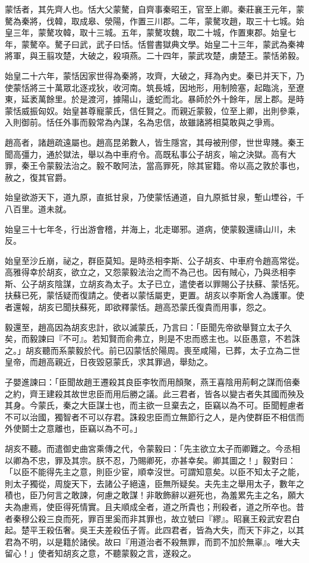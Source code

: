 
\begin{pinyinscope}
蒙恬者，其先齊人也。恬大父蒙驁，自齊事秦昭王，官至上卿。秦莊襄王元年，蒙驁為秦將，伐韓，取成皋、滎陽，作置三川郡。二年，蒙驁攻趙，取三十七城。始皇三年，蒙驁攻韓，取十三城。五年，蒙驁攻魏，取二十城，作置東郡。始皇七年，蒙驁卒。驁子曰武，武子曰恬。恬嘗書獄典文學。始皇二十三年，蒙武為秦裨將軍，與王翦攻楚，大破之，殺項燕。二十四年，蒙武攻楚，虜楚王。蒙恬弟毅。

始皇二十六年，蒙恬因家世得為秦將，攻齊，大破之，拜為內史。秦已并天下，乃使蒙恬將三十萬眾北逐戎狄，收河南。筑長城，因地形，用制險塞，起臨洮，至遼東，延袤萬餘里。於是渡河，據陽山，逶蛇而北。暴師於外十餘年，居上郡。是時蒙恬威振匈奴。始皇甚尊寵蒙氏，信任賢之。而親近蒙毅，位至上卿，出則參乘，入則御前。恬任外事而毅常為內謀，名為忠信，故雖諸將相莫敢與之爭焉。

趙高者，諸趙疏遠屬也。趙高昆弟數人，皆生隱宮，其母被刑僇，世世卑賤。秦王聞高彊力，通於獄法，舉以為中車府令。高既私事公子胡亥，喻之決獄。高有大罪，秦王令蒙毅法治之。毅不敢阿法，當高罪死，除其宦籍。帝以高之敦於事也，赦之，復其官爵。

始皇欲游天下，道九原，直抵甘泉，乃使蒙恬通道，自九原抵甘泉，塹山堙谷，千八百里。道未就。

始皇三十七年冬，行出游會稽，并海上，北走瑯邪。道病，使蒙毅還禱山川，未反。

始皇至沙丘崩，祕之，群臣莫知。是時丞相李斯、公子胡亥、中車府令趙高常從。高雅得幸於胡亥，欲立之，又怨蒙毅法治之而不為己也。因有賊心，乃與丞相李斯、公子胡亥陰謀，立胡亥為太子。太子已立，遣使者以罪賜公子扶蘇、蒙恬死。扶蘇已死，蒙恬疑而復請之。使者以蒙恬屬吏，更置。胡亥以李斯舍人為護軍。使者還報，胡亥已聞扶蘇死，即欲釋蒙恬。趙高恐蒙氏復貴而用事，怨之。

毅還至，趙高因為胡亥忠計，欲以滅蒙氏，乃言曰：「臣聞先帝欲舉賢立太子久矣，而毅諫曰『不可』。若知賢而俞弗立，則是不忠而惑主也。以臣愚意，不若誅之。」胡亥聽而系蒙毅於代。前已囚蒙恬於陽周。喪至咸陽，已葬，太子立為二世皇帝，而趙高親近，日夜毀惡蒙氏，求其罪過，舉劾之。

子嬰進諫曰：「臣聞故趙王遷殺其良臣李牧而用顏聚，燕王喜陰用荊軻之謀而倍秦之約，齊王建殺其故世忠臣而用后勝之議。此三君者，皆各以變古者失其國而殃及其身。今蒙氏，秦之大臣謀士也，而主欲一旦棄去之，臣竊以為不可。臣聞輕慮者不可以治國，獨智者不可以存君。誅殺忠臣而立無節行之人，是內使群臣不相信而外使鬬士之意離也，臣竊以為不可。」

胡亥不聽。而遣御史曲宮乘傳之代，令蒙毅曰：「先主欲立太子而卿難之。今丞相以卿為不忠，罪及其宗。朕不忍，乃賜卿死，亦甚幸矣。卿其圖之！」毅對曰：「以臣不能得先主之意，則臣少宦，順幸沒世。可謂知意矣。以臣不知太子之能，則太子獨從，周旋天下，去諸公子絕遠，臣無所疑矣。夫先主之舉用太子，數年之積也，臣乃何言之敢諫，何慮之敢謀！非敢飾辭以避死也，為羞累先主之名，願大夫為慮焉，使臣得死情實。且夫順成全者，道之所貴也；刑殺者，道之所卒也。昔者秦穆公殺三良而死，罪百里奚而非其罪也，故立號曰『繆』。昭襄王殺武安君白起。楚平王殺伍奢。吳王夫差殺伍子胥。此四君者，皆為大失，而天下非之，以其君為不明，以是籍於諸侯。故曰『用道治者不殺無罪，而罰不加於無辜』。唯大夫留心！」使者知胡亥之意，不聽蒙毅之言，遂殺之。


\end{pinyinscope}
